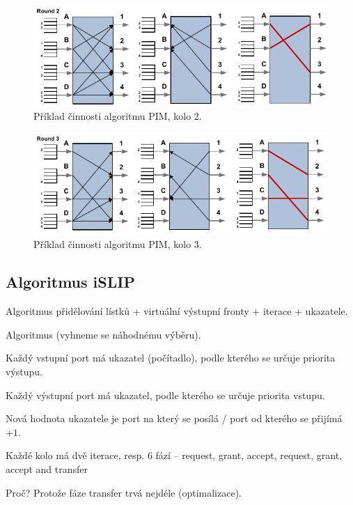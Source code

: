 \begin{figure}[H]
    \centering
    \includegraphics[width=1\linewidth]{algoritmus_pim_priklad_2.pdf}
    \caption{Příklad činnosti algoritmu PIM, kolo 2.}
\end{figure}

\begin{figure}[H]
    \centering
    \includegraphics[width=1\linewidth]{algoritmus_pim_priklad_3.pdf}
    \caption{Příklad činnosti algoritmu PIM, kolo 3.}
\end{figure}

\subsection{Algoritmus iSLIP}

\begin{compactitem}
    \item Algoritmus přidělování lístků + virtuální výstupní fronty + iterace + ukazatele.
    \item Algoritmus  (vyhneme se náhodnému výběru). \begin{compactitem}
        \item Každý vstupní port má ukazatel (počítadlo), podle kterého se určuje priorita výstupu.
        \item Každý výstupní port má ukazatel, podle kterého se určuje priorita vstupu.
        \item Nová hodnota ukazatele je port na který se posílá / port od kterého se přijímá $+ 1$.
    \end{compactitem}
    \item Každé kolo má dvě iterace, resp. 6 fází -- request, grant, accept, request, grant, accept and transfer \begin{compactitem}
        \item Proč? Protože fáze transfer trvá nejdéle (optimalizace).
    \end{compactitem}
\end{compactitem}

